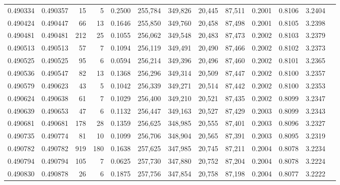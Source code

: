 \begin{tabular}{rrrrrrrrrrrrr}
0.490334 & 0.490357 &    15 &     5 &                                     0.2500 & 255,784 & 349,826 &  20,445 &  87,511 & 0.2001 & 0.8106 & 3.2404 \\
0.490424 & 0.490447 &    66 &    13 &                                     0.1646 & 255,850 & 349,760 &  20,458 &  87,498 & 0.2001 & 0.8105 & 3.2398 \\
0.490481 & 0.490481 &   212 &    25 &                                     0.1055 & 256,062 & 349,548 &  20,483 &  87,473 & 0.2002 & 0.8103 & 3.2379 \\
0.490513 & 0.490513 &    57 &     7 &                                     0.1094 & 256,119 & 349,491 &  20,490 &  87,466 & 0.2002 & 0.8102 & 3.2373 \\
0.490525 & 0.490525 &    95 &     6 &                                     0.0594 & 256,214 & 349,396 &  20,496 &  87,460 & 0.2002 & 0.8101 & 3.2365 \\
0.490536 & 0.490547 &    82 &    13 &                                     0.1368 & 256,296 & 349,314 &  20,509 &  87,447 & 0.2002 & 0.8100 & 3.2357 \\
0.490579 & 0.490623 &    43 &     5 &                                     0.1042 & 256,339 & 349,271 &  20,514 &  87,442 & 0.2002 & 0.8100 & 3.2353 \\
0.490624 & 0.490638 &    61 &     7 &                                     0.1029 & 256,400 & 349,210 &  20,521 &  87,435 & 0.2002 & 0.8099 & 3.2347 \\
0.490639 & 0.490653 &    47 &     6 &                                     0.1132 & 256,447 & 349,163 &  20,527 &  87,429 & 0.2003 & 0.8099 & 3.2343 \\
0.490681 & 0.490681 &   178 &    28 &                                     0.1359 & 256,625 & 348,985 &  20,555 &  87,401 & 0.2003 & 0.8096 & 3.2327 \\
0.490735 & 0.490774 &    81 &    10 &                                     0.1099 & 256,706 & 348,904 &  20,565 &  87,391 & 0.2003 & 0.8095 & 3.2319 \\
0.490782 & 0.490782 &   919 &   180 &                                     0.1638 & 257,625 & 347,985 &  20,745 &  87,211 & 0.2004 & 0.8078 & 3.2234 \\
0.490794 & 0.490794 &   105 &     7 &                                     0.0625 & 257,730 & 347,880 &  20,752 &  87,204 & 0.2004 & 0.8078 & 3.2224 \\
0.490830 & 0.490878 &    26 &     6 &                                     0.1875 & 257,756 & 347,854 &  20,758 &  87,198 & 0.2004 & 0.8077 & 3.2222 \\

\end{tabular}
